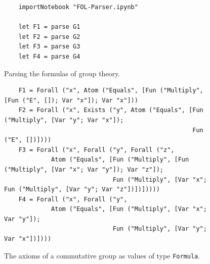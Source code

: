 \begin{figure}[!ht]
\centering
\begin{verbatim}
    importNotebook "FOL-Parser.ipynb"

    let F1 = parse G1
    let F2 = parse G2
    let F3 = parse G3
    let F4 = parse G4
\end{verbatim}
\vspace*{-0.3cm}
\caption{Parsing the formulas of group theory.}
\label{fig:fol-parse.py}
\end{figure}

\begin{figure}[!ht]
\centering
\begin{verbatim}
    F1 = Forall ("x", Atom ("Equals", [Fun ("Multiply", [Fun ("E", []); Var "x"]); Var "x"]))
    F2 = Forall ("x", Exists ("y", Atom ("Equals", [Fun ("Multiply", [Var "y"; Var "x"]); 
                                                    Fun ("E", [])])))
    F3 = Forall ("x", Forall ("y", Forall ("z", 
             Atom ("Equals", [Fun ("Multiply", [Fun ("Multiply", [Var "x"; Var "y"]); Var "z"]);
                              Fun ("Multiply", [Var "x"; Fun ("Multiply", [Var "y"; Var "z"])])]))))
    F4 = Forall ("x", Forall ("y", 
             Atom ("Equals", [Fun ("Multiply", [Var "x"; Var "y"]); 
                              Fun ("Multiply", [Var "y"; Var "x"])])))
\end{verbatim}
\vspace*{-0.3cm}
\caption{The axioms of a commutative group as values of type \texttt{Formula}.}
\label{fig:group-theory-tupel}
\end{figure}


